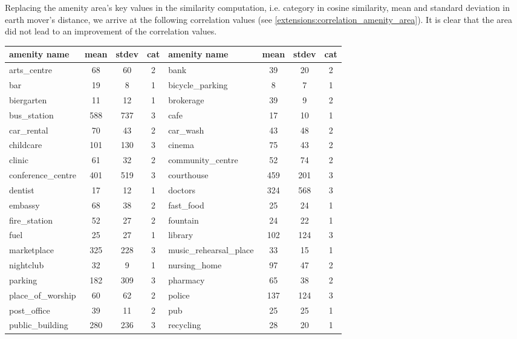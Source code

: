{Replacing the amenity area's key values in the similarity computation, i.e. category in cosine similarity, mean and standard deviation in earth mover's distance, we arrive at the following correlation values (see \autoref{extensions:correlation_amenity_area}). It is clear that the area did not lead to an improvement of the correlation values.

\begin{table}[!ht]
	{\color{green}
	\footnotesize
	\begin{tabular}{ | l | c | c | c || l | c | c | c |}
		\hline		
		\textbf{amenity name} & \textbf{mean} & \textbf{stdev} & \textbf{cat} & \textbf{amenity name} & \textbf{mean} & \textbf{stdev} & \textbf{cat} \\ \hline
		arts\_centre & 68 & 60 & 2 & bank & 39 & 20 & 2 \\ \hline
		bar & 19 & 8 & 1 & bicycle\_parking & 8 & 7 & 1 \\ \hline
		biergarten & 11 & 12 & 1 & brokerage & 39 & 9 & 2 \\ \hline
		bus\_station & 588 & 737 & 3 & cafe & 17 & 10 & 1 \\ \hline
		car\_rental & 70 & 43 & 2 & car\_wash & 43 & 48 & 2 \\ \hline
		childcare & 101 & 130 & 3 & cinema & 75 & 43 & 2 \\ \hline
		clinic & 61 & 32 & 2 & community\_centre & 52 & 74 & 2 \\ \hline
		conference\_centre & 401 & 519 & 3 & courthouse & 459 & 201 & 3 \\ \hline
		dentist & 17 & 12 & 1 & doctors & 324 & 568 & 3 \\ \hline
		embassy & 68 & 38 & 2 & fast\_food & 25 & 24 & 1 \\ \hline
		fire\_station & 52 & 27 & 2 & fountain & 24 & 22 & 1 \\ \hline
		fuel & 25 & 27 & 1 & library & 102 & 124 & 3 \\ \hline
		marketplace & 325 & 228 & 3 & music\_rehearsal\_place & 33 & 15 & 1 \\ \hline
		nightclub & 32 & 9 & 1 & nursing\_home & 97 & 47 & 2 \\ \hline
		parking & 182 & 309 & 3 & pharmacy & 65 & 38 & 2 \\ \hline
		place\_of\_worship & 60 & 62 & 2 & police & 137 & 124 & 3 \\ \hline
		post\_office & 39 & 11 & 2 & pub & 25 & 25 & 1 \\ \hline
		public\_building & 280 & 236 & 3 & recycling & 28 & 20 & 1 \\ \hline

\end{tabular}}
\end{table}}
